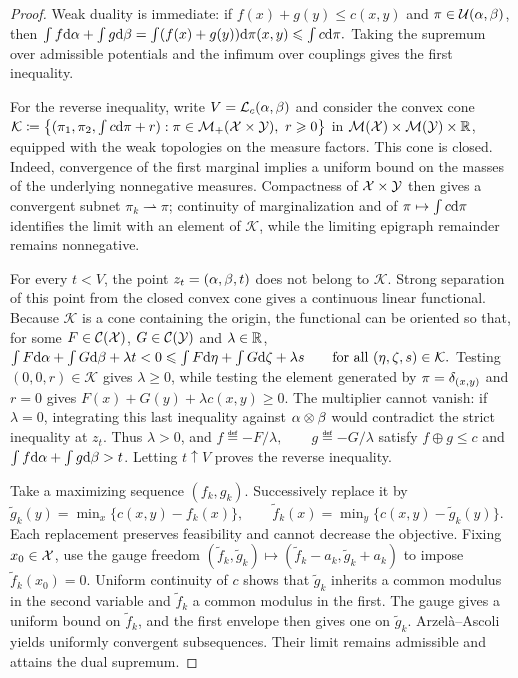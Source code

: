 \begin{proof}
Weak duality is immediate: if $f(x)+g(y)\leq c(x,y)$ and $\pi\in\mathcal{U}(\alpha,\beta)$, then
\(\int f\mathrm{d}\alpha+\int g\mathrm{d}\beta = \int (f(x)+g(y))\mathrm{d}\pi(x,y) \leqslant \int c\mathrm{d}\pi.\)
Taking the supremum over admissible potentials and the infimum over couplings gives the first inequality.

For the reverse inequality, write $V=\mathcal{L}_c(\alpha,\beta)$ and consider the convex cone
\(\mathcal K \eqdef \bigl\{(\pi_1,\pi_2,\textstyle\int c\d\pi+r): \pi\in\Mm_+(\X\times\Y),\ r\geq0\bigr\}\)
in $\mathcal{M}(\mathcal{X})\times\mathcal{M}(\mathcal{Y})\times\mathbb{R}$, equipped with the weak topologies on the measure factors. This cone is closed. Indeed, convergence of the first marginal implies a uniform bound on the masses of the underlying nonnegative measures. Compactness of $\mathcal{X}\times\mathcal{Y}$ then gives a convergent subnet $\pi_k\rightharpoonup\pi$; continuity of marginalization and of $\pi\mapsto\int c\mathrm{d}\pi$ identifies the limit with an element of $\mathcal K$, while the limiting epigraph remainder remains nonnegative.

For every $t<V$, the point $z_t=(\alpha,\beta,t)$ does not belong to $\mathcal K$. Strong separation of this point from the closed convex cone gives a continuous linear functional. Because $\mathcal K$ is a cone containing the origin, the functional can be oriented so that, for some $F\in\mathcal{C}(\mathcal{X})$, $G\in\mathcal{C}(\mathcal{Y})$ and $\lambda\in\mathbb{R}$,
\(\int F\mathrm{d}\alpha+\int G\mathrm{d}\beta+\lambda t<0 \leqslant \int F\mathrm{d}\eta+\int G\mathrm{d}\zeta+\lambda s \qquad \text{for all }(\eta,\zeta,s)\in\mathcal K.\)
Testing $(0,0,r)\in\mathcal K$ gives $\lambda\geq0$, while testing the element generated by $\pi=\delta_{(x,y)}$ and $r=0$ gives
$F(x)+G(y)+\lambda c(x,y)\geq0$. The multiplier cannot vanish: if $\lambda=0$, integrating this last inequality against $\alpha\otimes\beta$ would contradict the strict inequality at $z_t$. Thus $\lambda>0$, and
\(f\eqdef-F/\lambda,\qquad g\eqdef-G/\lambda\)
satisfy $f\oplus g\leq c$ and
$\int f\mathrm{d}\alpha+\int g\mathrm{d}\beta>t$. Letting $t\uparrow V$ proves the reverse inequality.

Take a maximizing sequence $(f_k,g_k)$. Successively replace it by \(\widetilde g_k(y)=\min_x\{c(x,y)-f_k(x)\}, \qquad \widetilde f_k(x)=\min_y\{c(x,y)-\widetilde g_k(y)\}.\)
Each replacement preserves feasibility and cannot decrease the objective. Fixing $x_0\in\mathcal{X}$, use the gauge freedom
$(\widetilde f_k,\widetilde g_k)\mapsto
(\widetilde f_k-a_k,\widetilde g_k+a_k)$
to impose $\widetilde f_k(x_0)=0$. Uniform continuity of $c$ shows that $\widetilde g_k$ inherits a common modulus in the second variable and $\widetilde f_k$ a common modulus in the first. The gauge gives a uniform bound on $\widetilde f_k$, and the first envelope then gives one on $\widetilde g_k$. Arzel\`a--Ascoli yields uniformly convergent subsequences. Their limit remains admissible and attains the dual supremum.
\end{proof}
